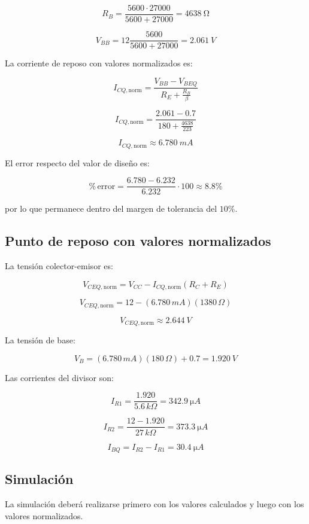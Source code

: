 \documentclass[a4paper,12pt]{article}
\begin{document}
\[
R_B
=
\frac{5600\cdot27000}{5600+27000}
=
\boxed{\SI{4638}{\ohm}}
\]

\[
V_{BB}
=
12\frac{5600}{5600+27000}
=
\boxed{\SI{2.061}{V}}
\]

La corriente de reposo con valores normalizados es:

\[
I_{CQ,\mathrm{norm}}
=
\frac{V_{BB}-V_{BEQ}}
{R_E+\frac{R_B}{\beta}}
\]

\[
I_{CQ,\mathrm{norm}}
=
\frac{2.061-0.7}
{180+\frac{4638}{223}}
\]

\[
\boxed{I_{CQ,\mathrm{norm}}\approx\SI{6.780}{mA}}
\]

El error respecto del valor de diseño es:

\[
\%\,\mathrm{error}
=
\frac{6.780-6.232}{6.232}\cdot100
\approx
8.8\%
\]

por lo que permanece dentro del margen de tolerancia del $10\%$.

\subsection{Punto de reposo con valores normalizados}

La tensión colector-emisor es:

\[
V_{CEQ,\mathrm{norm}}
=
V_{CC}
-
I_{CQ,\mathrm{norm}}(R_C+R_E)
\]

\[
V_{CEQ,\mathrm{norm}}
=
12
-
(6.780\,mA)(1380\,\Omega)
\]

\[
\boxed{V_{CEQ,\mathrm{norm}}\approx\SI{2.644}{V}}
\]

La tensión de base:

\[
V_B
=
(6.780\,mA)(180\,\Omega)+0.7
=
\boxed{\SI{1.920}{V}}
\]

Las corrientes del divisor son:

\[
I_{R1}
=
\frac{1.920}{5.6\,k\Omega}
=
\boxed{\SI{342.9}{\micro A}}
\]

\[
I_{R2}
=
\frac{12-1.920}{27\,k\Omega}
=
\boxed{\SI{373.3}{\micro A}}
\]

\[
I_{BQ}
=
I_{R2}-I_{R1}
=
\boxed{\SI{30.4}{\micro A}}
\]

\subsection{Simulación}

La simulación deberá realizarse primero con los valores calculados y luego con los valores
normalizados.
\end{document}
